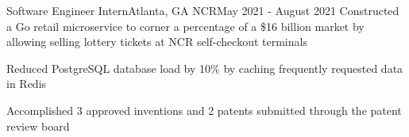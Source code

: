 \resumeSubheading
{Software Engineer Intern}{Atlanta, GA}
{NCR}{May 2021 - August 2021}
\resumeItemListStart
\resumeItem
{
  Constructed a Go retail microservice to corner a percentage of a \$16 billion
  market by allowing selling lottery tickets at NCR self-checkout terminals
}

\resumeItem
{
  Reduced PostgreSQL database load by 10\% by caching frequently requested data in
  Redis
}

\resumeItem
{
  Accomplished 3 approved inventions and 2 patents submitted through the patent review board
}

\resumeItemListEnd


